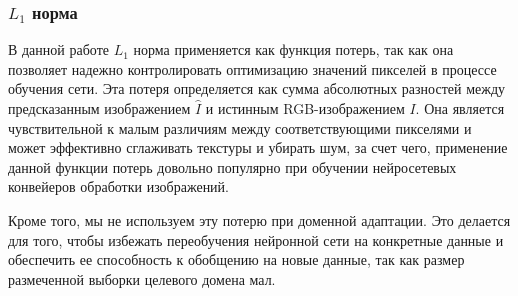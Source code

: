 \subsubsection{$L_1$ норма}

В данной работе $L_1$ норма применяется как функция потерь, так как она позволяет надежно контролировать оптимизацию значений пикселей в процессе обучения сети. Эта потеря определяется как сумма абсолютных разностей между предсказанным изображением $\hat{I}$ и истинным RGB-изображением $I$. Она является чувствительной к малым различиям между соответствующими пикселями и может эффективно сглаживать текстуры и убирать шум, за счет чего, применение данной функции потерь довольно популярно при обучении нейросетевых конвейеров обработки изображений.

Кроме того, мы не используем эту потерю при доменной адаптации. Это делается для того, чтобы избежать переобучения нейронной сети на конкретные данные и обеспечить ее способность к обобщению на новые данные, так как размер размеченной выборки целевого домена мал.
